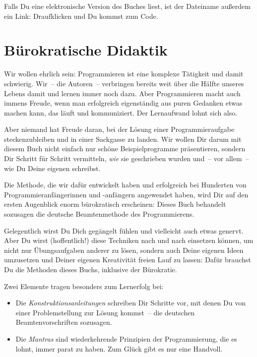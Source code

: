 \smallskip

%
Falls Du eine elektronische Version des Buches liest, ist der
Dateiname außerdem ein Link: Draufklicken und Du kommst zum Code.

\section{Bürokratische Didaktik}

Wir wollen ehrlich sein: Programmieren ist eine komplexe Tätigkeit und
damit schwierig.  Wir~-- die Autoren~-- verbringen bereits weit über
die Hälfte unseres Lebens damit und lernen immer noch dazu.  Aber
Programmieren macht auch immens Freude, wenn man erfolgreich
eigenständig aus puren Gedanken etwas machen kann, das läuft und
kommuniziert.  Der Lernaufwand lohnt sich also.

Aber niemand hat Freude daran, bei der Lösung einer Programmieraufgabe
steckenzubleiben und in einer Sackgasse zu landen.  Wir wollen Dir
darum mit diesem Buch nicht einfach nur schöne Beispielprogramme
präsentieren, sondern Dir Schritt für Schritt vermitteln, \emph{wie}
sie geschrieben wurden und~-- vor allem~-- wie Du Deine eigenen schreibst.

Die Methode, die wir dafür entwickelt haben und erfolgreich
bei Hunderten von Programmieranfängerinnen und -anfängern angewendet
haben, wird Dir auf den ersten Augenblick enorm bürokratisch
erscheinen: Dieses Buch behandelt sozusagen die deutsche
Beamtenmethode des Programmierens.

Gelegentlich wirst Du Dich gegängelt fühlen und vielleicht auch etwas
genervt.  Aber Du wirst (hoffentlich!) diese Techniken nach und nach
einsetzen können, um nicht nur Übungsaufgaben anderer zu lösen, sondern
auch Deine eigenen Ideen umzusetzen und Deiner eigenen Kreativität freien Lauf zu
lassen: Dafür brauchst Du die Methoden dieses Buchs, inklusive der
Bürokratie.

Zwei Elemente tragen besonders zum Lernerfolg bei:
%
\begin{itemize}
\item Die \textit{Konstruktionsanleitungen} schreiben Dir Schritte
  vor, mit denen Du von einer Problemstellung zur Lösung kommst~-- die
  deutschen Beamtenvorschriften sozusagen.
\item Die \textit{Mantras} sind wiederkehrende Prinzipien der
  Programmierung, die es lohnt, immer parat zu haben.  Zum Glück gibt
  es nur eine Handvoll.
\end{itemize}
%

